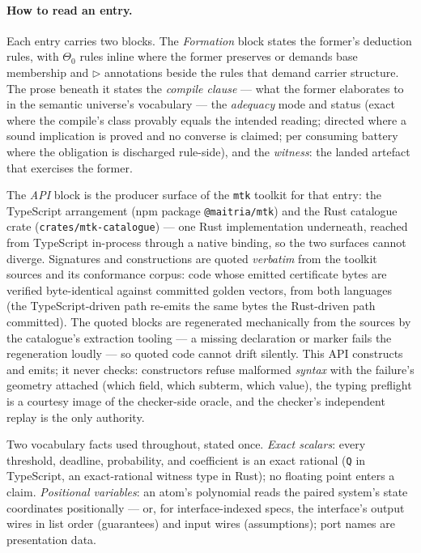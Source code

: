 \paragraph{How to read an entry.} Each entry carries two blocks. The
\emph{Formation} block states the former's deduction rules, with
$\Theta_0$ rules inline where the former preserves or demands base
membership and $\rhd$ annotations beside the rules that demand
carrier structure. The prose beneath it states the \emph{compile
clause} --- what the former elaborates to in the semantic universe's
vocabulary --- the \emph{adequacy} mode and status (exact where the
compile's class provably equals the intended reading; directed where
a sound implication is proved and no converse is claimed; per
consuming battery where the obligation is discharged rule-side), and
the \emph{witness}: the landed artefact that exercises the former.

The \emph{API} block is the producer surface of the \texttt{mtk}
toolkit for that entry: the TypeScript arrangement (npm package
\texttt{@maitria/mtk}) and the Rust catalogue crate
(\texttt{crates/mtk-catalogue}) --- one Rust implementation
underneath, reached from TypeScript in-process through a native
binding, so the two surfaces cannot diverge. Signatures and
constructions are quoted \emph{verbatim} from the toolkit sources and
its conformance corpus: code whose emitted certificate bytes are
verified byte-identical against committed golden vectors, from both
languages (the TypeScript-driven path re-emits the same bytes the
Rust-driven path committed). The quoted blocks are regenerated
mechanically from the sources by the catalogue's extraction tooling
--- a missing declaration or marker fails the regeneration loudly ---
so quoted code cannot drift silently. This API constructs and emits;
it never checks: constructors refuse malformed \emph{syntax} with the
failure's geometry attached (which field, which subterm, which
value), the typing preflight is a courtesy image of the checker-side
oracle, and the checker's independent replay is the only authority.

Two vocabulary facts used throughout, stated once. \emph{Exact
scalars}: every threshold, deadline, probability, and coefficient is
an exact rational (\texttt{Q} in TypeScript, an exact-rational
witness type in Rust); no floating point enters a claim.
\emph{Positional variables}: an atom's polynomial reads the paired
system's state coordinates positionally --- or, for interface-indexed
specs, the interface's output wires in list order (guarantees) and
input wires (assumptions); port names are presentation data.


